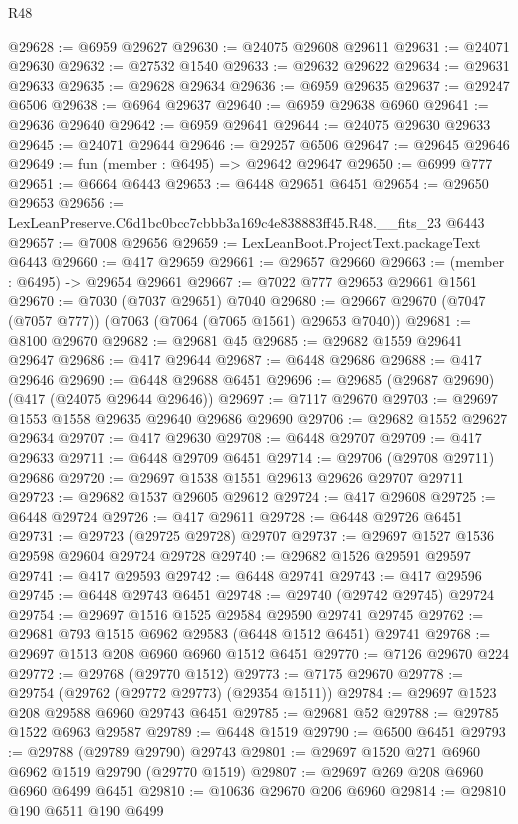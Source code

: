 \begin{lexlean}{R48}
\begin{coremodule}
@29628 := @6959 @29627
@29630 := @24075 @29608 @29611
@29631 := @24071 @29630
@29632 := @27532 @1540
@29633 := @29632 @29622
@29634 := @29631 @29633
@29635 := @29628 @29634
@29636 := @6959 @29635
@29637 := @29247 @6506
@29638 := @6964 @29637
@29640 := @6959 @29638 @6960
@29641 := @29636 @29640
@29642 := @6959 @29641
@29644 := @24075 @29630 @29633
@29645 := @24071 @29644
@29646 := @29257 @6506
@29647 := @29645 @29646
@29649 := fun (member : @6495) => @29642 @29647
@29650 := @6999 @777
@29651 := @6664 @6443
@29653 := @6448 @29651 @6451
@29654 := @29650 @29653
@29656 := LexLeanPreserve.C6d1bc0bcc7cbbb3a169c4e838883ff45.R48.__fits_23 @6443
@29657 := @7008 @29656
@29659 := LexLeanBoot.ProjectText.packageText @6443
@29660 := @417 @29659
@29661 := @29657 @29660
@29663 := (member : @6495) -> @29654 @29661
@29667 := @7022 @777 @29653 @29661 @1561
@29670 := @7030 (@7037 @29651) @7040
@29680 := @29667 @29670 (@7047 (@7057 @777)) (@7063 (@7064 (@7065 @1561) @29653 @7040))
@29681 := @8100 @29670
@29682 := @29681 @45
@29685 := @29682 @1559 @29641 @29647
@29686 := @417 @29644
@29687 := @6448 @29686
@29688 := @417 @29646
@29690 := @6448 @29688 @6451
@29696 := @29685 (@29687 @29690) (@417 (@24075 @29644 @29646))
@29697 := @7117 @29670
@29703 := @29697 @1553 @1558 @29635 @29640 @29686 @29690
@29706 := @29682 @1552 @29627 @29634
@29707 := @417 @29630
@29708 := @6448 @29707
@29709 := @417 @29633
@29711 := @6448 @29709 @6451
@29714 := @29706 (@29708 @29711) @29686
@29720 := @29697 @1538 @1551 @29613 @29626 @29707 @29711
@29723 := @29682 @1537 @29605 @29612
@29724 := @417 @29608
@29725 := @6448 @29724
@29726 := @417 @29611
@29728 := @6448 @29726 @6451
@29731 := @29723 (@29725 @29728) @29707
@29737 := @29697 @1527 @1536 @29598 @29604 @29724 @29728
@29740 := @29682 @1526 @29591 @29597
@29741 := @417 @29593
@29742 := @6448 @29741
@29743 := @417 @29596
@29745 := @6448 @29743 @6451
@29748 := @29740 (@29742 @29745) @29724
@29754 := @29697 @1516 @1525 @29584 @29590 @29741 @29745
@29762 := @29681 @793 @1515 @6962 @29583 (@6448 @1512 @6451) @29741
@29768 := @29697 @1513 @208 @6960 @6960 @1512 @6451
@29770 := @7126 @29670 @224
@29772 := @29768 (@29770 @1512)
@29773 := @7175 @29670
@29778 := @29754 (@29762 (@29772 @29773) (@29354 @1511))
@29784 := @29697 @1523 @208 @29588 @6960 @29743 @6451
@29785 := @29681 @52
@29788 := @29785 @1522 @6963 @29587
@29789 := @6448 @1519
@29790 := @6500 @6451
@29793 := @29788 (@29789 @29790) @29743
@29801 := @29697 @1520 @271 @6960 @6962 @1519 @29790 (@29770 @1519)
@29807 := @29697 @269 @208 @6960 @6960 @6499 @6451
@29810 := @10636 @29670 @206 @6960
@29814 := @29810 @190 @6511 @190 @6499

\end{coremodule}
\end{lexlean}
